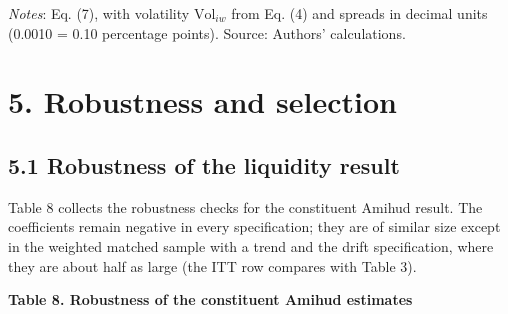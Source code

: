 \emph{Notes}: Eq. (7), with volatility \(\mathrm{Vol}_{iw}\) from Eq.
(4) and spreads in decimal units (0.0010 = 0.10 percentage points).
Source: Authors' calculations.

\hypertarget{robustness-and-selection}{%
\section{5. Robustness and selection}\label{robustness-and-selection}}

\hypertarget{robustness-of-the-liquidity-result}{%
\subsection{5.1 Robustness of the liquidity
result}\label{robustness-of-the-liquidity-result}}

Table 8 collects the robustness checks for the constituent Amihud
result. The coefficients remain negative in every specification; they
are of similar size except in the weighted matched sample with a trend
and the drift specification, where they are about half as large (the ITT
row compares with Table 3).

\textbf{Table 8. Robustness of the constituent Amihud estimates}

